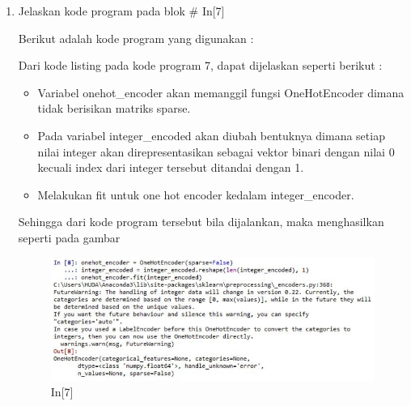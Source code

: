 \begin{enumerate}
\begin{figure}[!htbp]
\end{figure}
\item Jelaskan kode program pada blok \# In[7]
\par Berikut adalah kode program yang digunakan :

\par Dari kode listing pada kode program 7, dapat dijelaskan seperti berikut :
\begin{itemize}
\item Variabel onehot\_encoder akan memanggil fungsi OneHotEncoder dimana tidak berisikan matriks sparse.
\item Pada variabel integer\_encoded akan diubah bentuknya dimana setiap nilai integer akan direpresentasikan sebagai vektor binari dengan nilai 0 kecuali index dari integer tersebut ditandai dengan 1.
\item Melakukan fit untuk one hot encoder kedalam integer\_encoder.
\end{itemize}
\par Sehingga dari kode program tersebut bila dijalankan, maka menghasilkan seperti pada gambar 
\begin{figure}[!htbp]
	\centerline{\includegraphics[width=1\textwidth]{figures/andi/p7.PNG}}
	\caption{In[7]}
	

\end{figure}
\end{enumerate}
